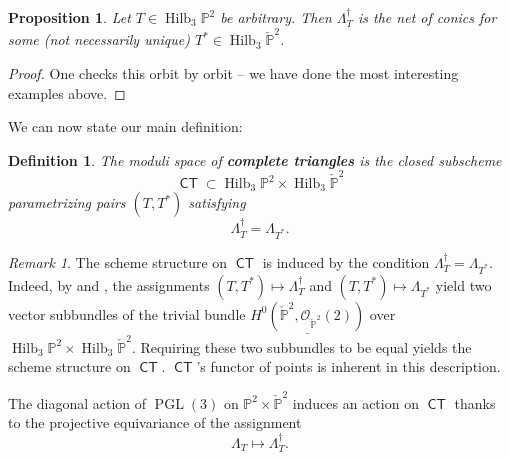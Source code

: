 \documentclass[reqno, 11pt]{amsart}
\theoremstyle{plain}
\newtheorem{proposition}[theorem]{Proposition}
\newtheorem{definition}[theorem]{Definition}
\theoremstyle{remark}
\newtheorem{remark}[theorem]{Remark}
\renewcommand{\P}{\mathbb{P}}
\DeclareMathOperator{\PGL}{PGL}
\DeclareMathOperator{\Hilb}{Hilb}
\renewcommand{\O}{\mathcal{O}}
\DeclareMathOperator{\CT}{\mathsf{CT}}
\begin{document}
\begin{proposition} Let $T \in \Hilb_{3}\P^{2}$ be arbitrary. Then $\Lambda_{T}^{\dagger}$ is the net of conics for some (not
    necessarily unique) $T^{*} \in \Hilb_{3}\check{\P}^{2}$.

\end{proposition}
\begin{proof}
  One checks this orbit by orbit -- we have done the most interesting examples above.  
\end{proof}




We can now state our main definition:

\begin{definition}\label{def:CT}
  The moduli space of {\bf complete triangles} is the closed subscheme
  $$\CT \subset \Hilb_{3}\P^{2} \times \Hilb_{3}\check{\P}^{2}$$ parametrizing
  pairs $(T, T^{*})$ satisfying
  \[\Lambda_{T}^{\dagger} = \Lambda_{T^{*}}.\]
\end{definition}

\begin{remark}
  The scheme structure on $\CT$ is induced by the condition
  $\Lambda_{T}^{\dagger} = \Lambda_{T^{*}}.$ Indeed, by
   and
  , the assignments
  $(T, T^{*}) \mapsto \Lambda_{T}^{\dagger}$ and
  $(T, T^{*}) \mapsto \Lambda_{T^{*}}$ yield two vector subbundles of
  the trivial bundle $\underline{H^{0}(\check{\P}^{2}, \O_{\check{\P}^{2}}(2))}$
  over $\Hilb_{3}\P^{2} \times \Hilb_{3}\check{\P}^{2}$.  Requiring these two subbundles to be equal yields the scheme structure on
  $\CT$. $\CT$'s functor of points is inherent in this description.
\end{remark}





The diagonal action of $\PGL(3)$ on $\P^{2} \times \check{\P}^{2}$ induces an action on $\CT$  thanks to the projective equivariance of the assignment
\[\Lambda_{T} \mapsto \Lambda_{T}^{\dagger}.\] 
\end{document}
